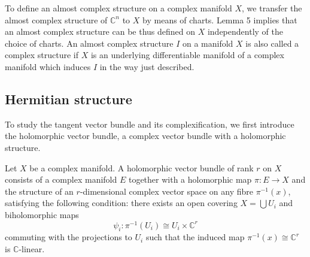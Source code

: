 \documentclass{ctexart}
\begin{document}
To define an almost complex structure on a complex manifold $X$, we transfer the almost complex structure of $\mathbb{C}^n$ to $X$ by means of charts. Lemma 5 implies that an almost complex structure 
can be thus defined on $X$ independently of the choice of charts. 
An almost complex structure $I$ on a manifold $X$ is also called a complex structure 
if $X$ is an underlying differentiable manifold of a complex manifold which induces $I$ in the way just described.

\subsection*{Hermitian structure}


To study the tangent vector bundle and its complexification, we first introduce the holomorphic vector bundle, a complex vector bundle with a holomorphic structure.
\begin{definition}
  Let $X$ be a complex manifold. A holomorphic vector bundle of rank $r$ on $X$ consists of a complex manifold $E$ together with a holomorphic map $\pi: E \longrightarrow X$ and 
  the structure of an $r$-dimensional complex vector space on any fibre $\pi^{-1}(x)$, satisfying the following condition: there exists an open covering $X=\bigcup U_i$ and biholomorphic maps 
  $$
  \psi_i: \pi^{-1}\left(U_i\right) \cong U_i \times \mathbb{C}^r
  $$ 
  commuting with the projections to $U_i$ such that the induced map $\pi^{-1}(x) \cong \mathbb{C}^r$ is $\mathbb{C}$-linear.  
\end{definition}
\end{document}
